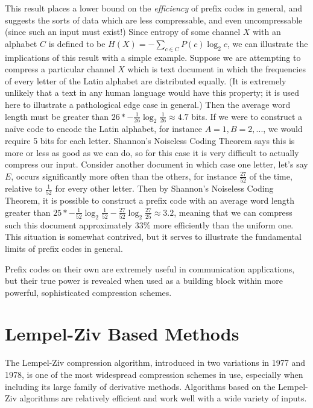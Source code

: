 \documentclass[12pt]{article}
\begin{document}
This result places a lower bound on the \emph{efficiency} of prefix
codes in general, and suggests the sorts of data which are less
compressable, and even uncompressable (since such an input must
exist!) Since entropy of some channel $X$ with an alphabet $C$ is
defined to be $H(X) = -\sum_{c \in C} P(c)\log_2{c}$, we can
illustrate the implications of this result with a simple
example. Suppose we are attempting to compress a particular channel
$X$ which is text document in which the frequencies of every letter of
the Latin alphabet are distributed equally. (It is extremely unlikely
that a text in any human language would have this property; it is used
here to illustrate a pathological edge case in general.) Then the
average word length must be greater than
$26 * -\frac{1}{26} \log_2{\frac{1}{26}} \approx 4.7$ bits. If we were
to construct a naïve code to encode the Latin alphabet, for instance
$A=1, B=2,...$, we would require 5 bits for each letter. Shannon's
Noiseless Coding Theorem says this is more or less as good as we can
do, so for this case it is very difficult to actually compress our
input. Consider another document in which case one letter, let's say
$E$, occurs significantly more often than the others, for instance
$\frac{27}{52}$ of the time, relative to $\frac{1}{52}$ for every
other letter. Then by Shannon's Noiseless Coding Theorem, it is
possible to construct a prefix code with an average word length
greater than
$25 * -\frac{1}{52} \log_2{\frac{1}{52}} - \frac{27}{52}
\log_2{\frac{27}{25}} \approx 3.2$, meaning that we can compress such
this document approximately $33\%$ more efficiently than the uniform
one. This situation is somewhat contrived, but it serves to illustrate
the fundamental limits of prefix codes in general.

Prefix codes on their own are extremely useful in communication
applications, but their true power is revealed when used as a building
block within more powerful, sophisticated compression schemes.

\section{Lempel-Ziv Based Methods}

The Lempel-Ziv compression algorithm, introduced in two variations in
1977 and 1978, is one of the most widespread compression schemes in
use, especially when including its large family of derivative
methods. Algorithms based on the Lempel-Ziv algorithms are relatively
efficient and work well with a wide variety of inputs.
\end{document}
